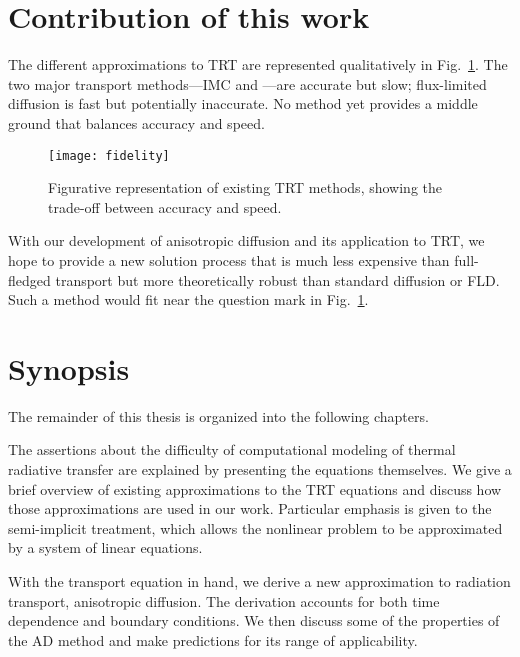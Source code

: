 \section{Contribution of this work}

The different approximations to TRT are represented qualitatively in
Fig.~\ref{fig:fidelity}. The two major transport methods---IMC and \SN---are
accurate but slow; flux-limited diffusion is fast but potentially
inaccurate. No method yet provides a middle ground that balances accuracy and
speed.

\begin{figure}[htb]
  \centering
  \texttt{[image: fidelity]}
  \caption{Figurative representation of existing TRT methods, showing the
  trade-off between accuracy and speed.}
  \label{fig:fidelity}
\end{figure}

With our development of anisotropic diffusion and its application to TRT, we
hope to provide a new solution process that is much less expensive than
full-fledged transport but more theoretically robust than standard diffusion or
FLD. Such a method would fit near the question mark in
Fig.~\ref{fig:fidelity}.

\section{Synopsis}

The remainder of this thesis is organized into the following chapters.

The assertions about the difficulty of computational modeling of thermal
radiative transfer are explained by presenting the equations themselves. We give
a brief overview of existing approximations to the TRT equations and discuss how
those approximations are used in our work. Particular emphasis is given to the
semi-implicit treatment, which allows the nonlinear problem to be approximated
by a system of linear equations.

With the transport equation in hand, we derive a new approximation to radiation
transport, anisotropic diffusion. The derivation accounts for both time
dependence and boundary conditions. We then discuss some of the properties of
the AD method and make predictions for its range of applicability.


